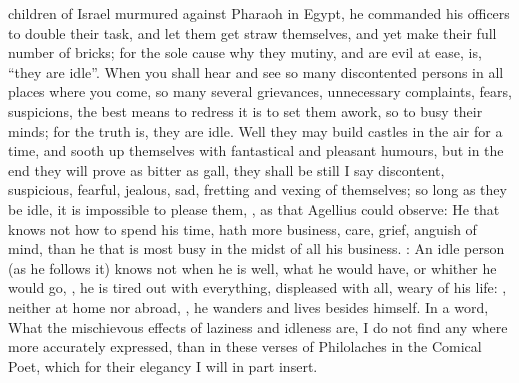 children of Israel murmured against Pharaoh in Egypt, he
commanded his officers to double their task, and let them get straw themselves,
and yet make their full number of bricks; for the sole cause why they mutiny,
and are evil at ease, is, \enquote{they are idle}. When you shall hear and see so many
discontented persons in all places where you come, so many several grievances,
unnecessary complaints, fears, suspicions, the best means
to redress it is to set them awork, so to busy their minds; for the truth is,
they are idle. Well they may build castles in the air for a time, and sooth up
themselves with fantastical and pleasant humours, but in the end they will
prove as bitter as gall, they shall be still I say discontent, suspicious,
fearful, jealous, sad, fretting and vexing of themselves;
so long as they be idle, it is impossible to please them, , as that
Agellius could observe: He that knows not how to spend his
time, hath more business, care, grief, anguish of mind, than he that is most
busy in the midst of all his business. :
An idle person (as he follows it) knows not when he is well, what he would
have, or whither he would go, , he is
tired out with everything, displeased with all, weary of his life: , neither at home nor abroad, , he wanders and lives besides himself. In a word, What the mischievous
effects of laziness and idleness are, I do not find any where more accurately
expressed, than in these verses of Philolaches in the
Comical Poet, which for their elegancy I will in part
insert.

